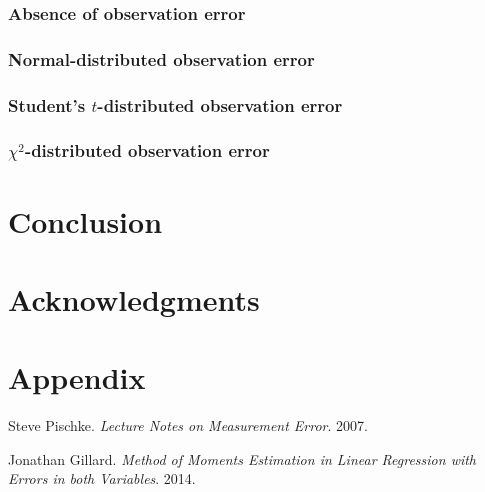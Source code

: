 \documentclass{article}
\begin{document}
\subsubsection{Absence of observation error}

\subsubsection{Normal-distributed observation error}

\subsubsection{Student's $t$-distributed observation error}

\subsubsection{$\chi^2$-distributed observation error}

\section{Conclusion}

\section{Acknowledgments}

\section{Appendix}

\begin{thebibliography}{9}

    Steve Pischke.
    \textit{Lecture Notes on Measurement Error}.
    2007.

    Jonathan Gillard.
    \textit{Method of Moments Estimation in Linear Regression with Errors in both Variables}.
    2014.

\end{thebibliography}
\end{document}
